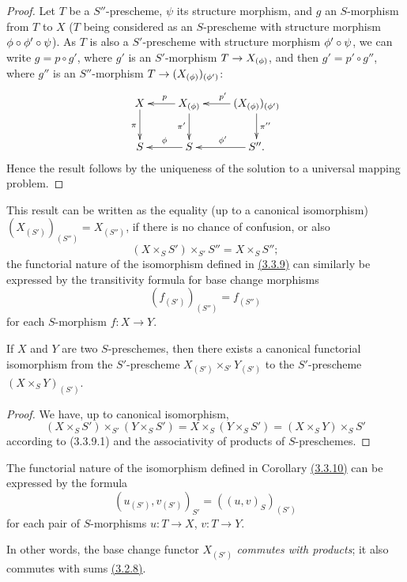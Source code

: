 \begin{proof}
\label{proof-prop-1.3.3.9}
Let $T$ be a $S''$-prescheme, $\psi$ its structure morphism, and $g$ an
$S$-morphism from $T$ to $X$ ($T$ being considered as an $S$-prescheme with
structure morphism $\phi\circ\phi'\circ\psi$). As $T$ is also a $S'$-prescheme
with structure morphism $\phi'\circ\psi$, we can write $g=p\circ g'$, where
$g'$ is an $S'$-morphism $T\to X_{(\phi)}$, and then $g'=p'\circ g''$, where
$g''$ is an $S''$-morphism $T\to(X_{(\phi)})_{(\phi')}$:
\[
  \xymatrix{
    X\ar[d]_\pi &
    X_{(\vphi)}\ar[l]_p\ar[d]_{\pi'} &
    (X_{(\vphi)})_{(\vphi')}\ar[l]_{p'}\ar[d]^{\pi''}\\
    S &
    S\ar[l]_\vphi &
    S''\ar[l]_{\vphi'}.
  }
\]
Hence the result follows by the uniqueness of the solution to a universal
mapping problem.
\end{proof}

This result can be written as the equality (up to a canonical isomorphism)
$(X_{(S')})_{(S'')}=X_{(S'')}$, if there is no chance of confusion, or also
\[
  (X\times_S S')\times_{S'}S''=X\times_S S'';
  \tag{3.3.9.1}
\]
the functorial nature of the isomorphism defined in \hyperref[prop-1.3.3.9]{(3.3.9)} can
similarly be expressed by the transitivity formula for base change morphisms
\[
  (f_{(S')})_{(S'')}=f_{(S'')}
  \tag{3.3.9.2}
\]
for each $S$-morphism $f:X\to Y$.

\begin{cor}[3.3.10]
\label{cor-1.3.3.10}
If $X$ and $Y$ are two $S$-preschemes, then there exists a canonical functorial
isomorphism from the $S'$-prescheme $X_{(S')}\times_{S'}Y_{(S')}$ to the
$S'$-prescheme $(X\times_S Y)_{(S')}$.
\end{cor}

\begin{proof}
\label{proof-cor-1.3.3.10}
We have, up to canonical isomorphism,
\[
  (X\times_S S')\times_{S'}(Y\times_S S')
  =X\times_S(Y\times_S S')=(X\times_S Y)\times_S S'
\]
according to (3.3.9.1) and the associativity of products of $S$-preschemes.
\end{proof}

The functorial nature of the isomorphism defined in
Corollary \hyperref[cor-1.3.3.10]{(3.3.10)} can be expressed by the formula
\[
  (u_{(S')},v_{(S')})_{S'}=((u,v)_S)_{(S')}
  \tag{3.3.10.1}
\]
for each pair of $S$-morphisms $u:T\to X$, $v:T\to Y$.

In other words, the base change functor $X_{(S')}$ {\it commutes with
products}; it also commutes with sums \hyperref[env-1.3.2.8]{(3.2.8)}.

